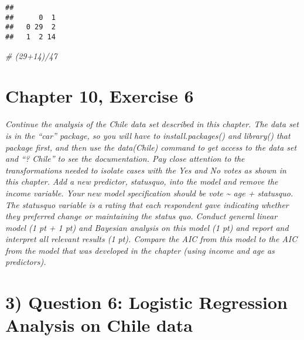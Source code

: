 \documentclass[]{article}
\newenvironment{Shaded}{\begin{snugshade}}{\end{snugshade}}
\newcommand{\CommentTok}[1]{\textcolor[rgb]{0.56,0.35,0.01}{\textit{#1}}}
\begin{document}
\begin{verbatim}
##    
##      0  1
##   0 29  2
##   1  2 14
\end{verbatim}

\begin{Shaded}
\begin{Highlighting}[]
\CommentTok{# (29+14)/47}
\end{Highlighting}
\end{Shaded}

\hypertarget{chapter-10-exercise-6}{%
\section{Chapter 10, Exercise 6}\label{chapter-10-exercise-6}}

\emph{Continue the analysis of the Chile data set described in this
chapter. The data set is in the ``car'' package, so you will have to
install.packages() and library() that package first, and then use the
data(Chile) command to get access to the data set and ``? Chile'' to see
the documentation. Pay close attention to the transformations needed to
isolate cases with the Yes and No votes as shown in this chapter. Add a
new predictor, statusquo, into the model and remove the income variable.
Your new model specification should be vote \textasciitilde{} age +
statusquo. The statusquo variable is a rating that each respondent gave
indicating whether they preferred change or maintaining the status quo.
Conduct general linear model (1 pt + 1 pt) and Bayesian analysis on this
model (1 pt) and report and interpret all relevant results (1 pt).
Compare the AIC from this model to the AIC from the model that was
developed in the chapter (using income and age as predictors). }

\hypertarget{question-6-logistic-regression-analysis-on-chile-data}{%
\section{3) Question 6: Logistic Regression Analysis on Chile
data}\label{question-6-logistic-regression-analysis-on-chile-data}}
\end{document}
